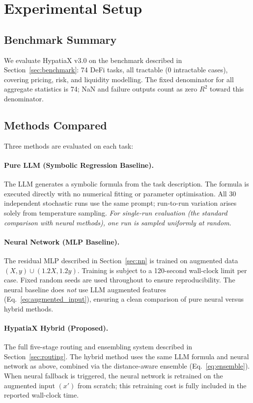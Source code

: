 \documentclass[twoside,11pt]{article}
\newcommand{\Rsq}{R^{2}}
\begin{document}
\section{Experimental Setup}
\label{sec:setup}

\subsection{Benchmark Summary}

We evaluate HypatiaX v3.0 on the benchmark described in Section~\ref{sec:benchmark}:
74 DeFi tasks, all tractable (0 intractable cases), covering pricing, risk, and
liquidity modelling.  The fixed denominator for all aggregate statistics is 74;
NaN and failure outputs count as zero $\Rsq$ toward this denominator.

\subsection{Methods Compared}

Three methods are evaluated on each task:

\paragraph{Pure LLM (Symbolic Regression Baseline).}
The LLM generates a symbolic formula from the task description.  The formula is
executed directly with no numerical fitting or parameter optimisation.  All 30
independent stochastic runs use the same prompt; run-to-run variation arises
solely from temperature sampling.  \emph{For single-run evaluation (the standard
comparison with neural methods), one run is sampled uniformly at random.}

\paragraph{Neural Network (MLP Baseline).}
The residual MLP described in Section~\ref{sec:nn} is trained on augmented data
$(X, y) \cup (1.2X, 1.2y)$.  Training is subject to a 120-second wall-clock
limit per case.  Fixed random seeds are used throughout to ensure reproducibility.
The neural baseline does \emph{not} use LLM augmented features (Eq.~\ref{eq:augmented_input}),
ensuring a clean comparison of pure neural versus hybrid methods.

\paragraph{HypatiaX Hybrid (Proposed).}
The full five-stage routing and ensembling system described in Section~\ref{sec:routing}.
The hybrid method uses the same LLM formula and neural network as above, combined via
the distance-aware ensemble (Eq.~\ref{eq:ensemble}).  When neural fallback is triggered,
the neural network is retrained on the augmented input $(x')$ from scratch; this
retraining cost is fully included in the reported wall-clock time.
\end{document}
